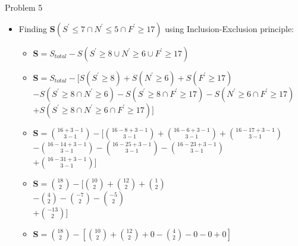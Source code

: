 \documentclass{beamer}
\begin{document}
\begin{frame}{Problem 5}
    \begin{itemize} 
        \item Finding \textbf{S}$(S^{'} \leq 7 \cap N^{'} \leq 5 \cap F^{'} \geq 17)$ using Inclusion-Exclusion principle:
        \begin{itemize}
            \item \textbf{S}$= S_{total} - S(S^{'} \geq 8 \cup N^{'} \geq 6 \cup F^{'} \geq 17)$
            \item \textbf{S}$= S_{total} - [S(S^{'} \geq 8) + S(N^{'} \geq 6)  + S(F^{'} \geq 17)$ \\
                    $- S(S^{'} \geq 8 \cap N^{'} \geq 6) - S(S^{'} \geq 8 \cap F^{'} \geq 17) - S(N^{'} \geq 6 \cap F^{'} \geq 17)$ \\
                    $+ S(S^{'} \geq 8 \cap N^{'} \geq 6 \cap F^{'} \geq 17)]$
            \item \textbf{S}$= {16 + 3 - 1 \choose 3 - 1} - [{16 - 8 + 3 - 1 \choose 3 - 1} + {16 - 6 + 3 - 1 \choose 3 - 1} + {16 - 17 + 3 - 1 \choose 3 - 1}$ \\
                    $- {16 - 14 + 3 - 1 \choose 3 - 1} - {16 - 25 + 3 - 1 \choose 3 - 1} - {16 - 23 + 3 - 1 \choose 3 - 1}$ \\
                    $+ {16 - 31 + 3 - 1 \choose 3 - 1}]$
            \item \textbf{S}$= {18 \choose 2} - [{10 \choose 2} + {12 \choose 2} + {1 \choose 2}$ \\
                    $- {4 \choose 2} - {-7 \choose 2} - {-5 \choose 2}$ \\
                    $+ {-13 \choose 2}]$
            \item \textbf{S}$= {18 \choose 2} - [{10 \choose 2} + {12 \choose 2} + 0 - {4 \choose 2} - 0 - 0 + 0]$
        \end{itemize}
    \end{itemize}
\end{frame}
\end{document}
